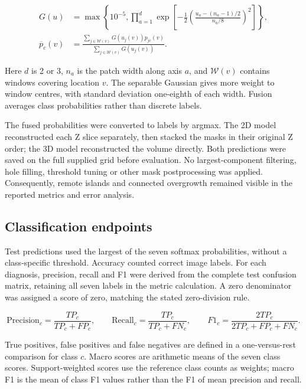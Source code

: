 \documentclass[11pt,a4paper]{article}
\begin{document}
\begin{equation}
\label{eq:window-fusion}
\begin{aligned}G(u)&=\max\!\left\{10^{-5},\prod_{a=1}^{d}\exp\!\left[-\frac{1}{2}\left(\frac{u_a-(n_a-1)/2}{n_a/8}\right)^2\right]\right\},\\[4pt]\overline p_c(v)&=\frac{\sum_{j\in\mathcal{W}(v)}G(u_j(v))p_{jc}(v)}{\sum_{j\in\mathcal{W}(v)}G(u_j(v))}.\end{aligned}
\end{equation}


Here $d$ is 2 or 3, $n_a$ is the patch width along axis $a$, and $\mathcal{W}(v)$ contains windows covering location $v$. The separable Gaussian gives more weight to window centres, with standard deviation one-eighth of each width. Fusion averages class probabilities rather than discrete labels.



The fused probabilities were converted to labels by argmax. The 2D model reconstructed each Z slice separately, then stacked the masks in their original Z order; the 3D model reconstructed the volume directly. Both predictions were saved on the full supplied grid before evaluation. No largest-component filtering, hole filling, threshold tuning or other mask postprocessing was applied. Consequently, remote islands and connected overgrowth remained visible in the reported metrics and error analysis.



\subsection*{Classification endpoints}

Test predictions used the largest of the seven softmax probabilities, without a class-specific threshold. Accuracy counted correct image labels. For each diagnosis, precision, recall and F1 were derived from the complete test confusion matrix, retaining all seven labels in the metric calculation. A zero denominator was assigned a score of zero, matching the stated zero-division rule.




\begin{equation}
\label{eq:classification-metrics}
\mathrm{Precision}_c=\frac{TP_c}{TP_c+FP_c},\qquad \mathrm{Recall}_c=\frac{TP_c}{TP_c+FN_c},\qquad F1_c=\frac{2TP_c}{2TP_c+FP_c+FN_c}.
\end{equation}


True positives, false positives and false negatives are defined in a one-versus-rest comparison for class $c$. Macro scores are arithmetic means of the seven class scores. Support-weighted scores use the reference class counts as weights; macro F1 is the mean of class F1 values rather than the F1 of mean precision and recall.
\end{document}

